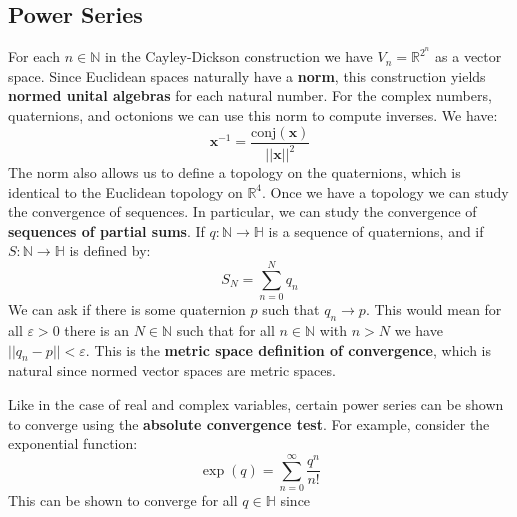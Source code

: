 \documentclass{article}
\begin{document}
        \subsection{Power Series}
            For each $n\in\mathbb{N}$ in the Cayley-Dickson construction
            we have $V_{n}=\mathbb{R}^{2^{n}}$ as a vector space.
            Since Euclidean spaces naturally have a \textbf{norm},
            this construction yields \textbf{normed unital algebras} for each
            natural number. For the complex numbers, quaternions, and
            octonions we can use this norm to compute inverses.
            We have:
            \begin{equation}
                \mathbf{x}^{-1}
                =\frac{\textrm{conj}(\mathbf{x})}{||\mathbf{x}||^{2}}
            \end{equation}
            The norm also allows us to define a topology on the
            quaternions, which is identical to the Euclidean topology on
            $\mathbb{R}^{4}$. Once we have a topology we can study the
            convergence of sequences. In particular, we can study the
            convergence of \textbf{sequences of partial sums}. If
            $q:\mathbb{N}\rightarrow\mathbb{H}$ is a sequence of quaternions,
            and if $S:\mathbb{N}\rightarrow\mathbb{H}$ is defined by:
            \begin{equation}
                S_{N}=\sum_{n=0}^{N}q_{n}
            \end{equation}
            We can ask if there is some quaternion $p$ such that
            $q_{n}\rightarrow{p}$. This would mean for all
            $\varepsilon>0$ there is an $N\in\mathbb{N}$ such that for all
            $n\in\mathbb{N}$ with $n>N$ we have
            $||q_{n}-p||<\varepsilon$. This is the
            \textbf{metric space definition of convergence}, which is natural
            since normed vector spaces are metric spaces.
            \par\hfill\par
            Like in the case of real and complex variables, certain power
            series can be shown to converge using the
            \textbf{absolute convergence test}. For example, consider the
            exponential function:
            \begin{equation}
                \exp(q)
                =\sum_{n=0}^{\infty}\frac{q^{n}}{n!}
            \end{equation}
            This can be shown to converge for all $q\in\mathbb{H}$ since
\end{document}
